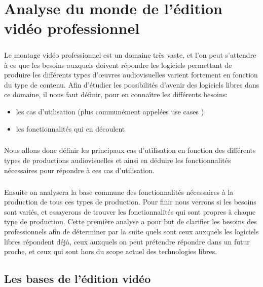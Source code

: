 \chapter {Analyse du monde de l'édition vidéo professionnel}
\minitoc \mtcskip \newpage
\paragraph{}
Le montage vidéo professionnel est un domaine très vaste, et l'on peut
s'attendre à ce que les besoins auxquels doivent répondre les logiciels
permettant de produire les différents types d'œuvres audiovisuelles
varient fortement en fonction du type de contenu. Afin d'étudier
les possibilités d'avenir des logiciels libres dans ce domaine, il nous faut
définir, pour en connaître les différents besoins:
\begin {itemize}
  \item {les cas d'utilisation (plus communément appelées use cases )}
  \item {les fonctionnalités qui en découlent}
\end{itemize}


\paragraph{}
Nous allons donc définir les principaux cas d'utilisation en fonction des
différents types de productions audiovisuelles et ainsi en déduire les fonctionnalités
nécessaires pour répondre à ces cas d'utilisation.

\paragraph{}
Ensuite on analysera la base commune des fonctionnalités nécessaires à la
production de tous ces types de production.  Pour finir
nous verrons si les besoins sont variés, et essayerons de trouver les
fonctionnalités qui sont propres à chaque type de production. Cette première
analyse a pour but de clarifier les besoins des professionnels afin de
déterminer par la suite quels sont ceux auxquels les logiciels libres répondent déjà,
ceux auxquels on peut prétendre répondre dans un futur proche, et ceux qui
sont hors du scope actuel des technologies libres.

\newpage
\section{Les bases de l'édition vidéo}

